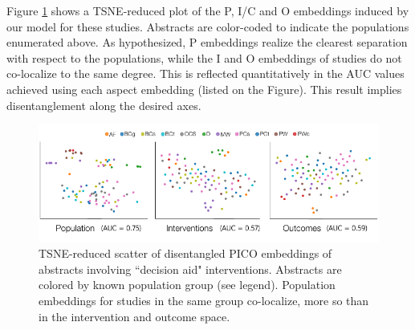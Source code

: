 \documentclass[11pt,a4paper]{article}
\begin{document}
Figure \ref{figure:DATSNE} shows a TSNE-reduced plot of the P, I/C and O embeddings induced by our model for these studies. Abstracts are color-coded to indicate the populations enumerated above. As hypothesized, P embeddings realize the clearest separation with respect to the populations, while the I and O embeddings of studies do not co-localize to the same degree. This is reflected quantitatively in the AUC values achieved using each aspect embedding (listed on the Figure). This result implies disentanglement along the desired axes.

\begin{figure}
\includegraphics[width=\linewidth]{figures/decisionaidsauc.pdf}
\vspace{-2.75em}
\caption{TSNE-reduced scatter of disentangled PICO embeddings of abstracts involving ``decision aid" interventions. Abstracts are colored by known population group (see legend). Population embeddings for studies in the same group co-localize, more so than in the intervention and outcome space.}
\label{figure:DATSNE}
\vspace{-.75em}
\end{figure}

\end{document}
